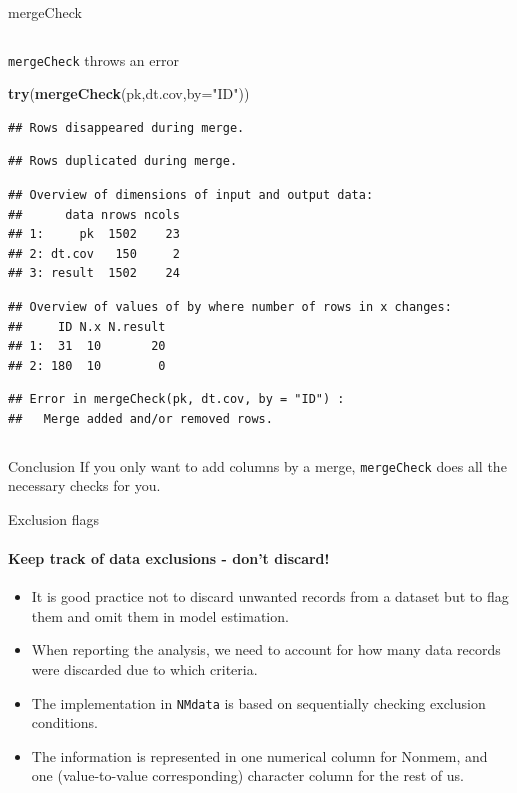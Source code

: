 \documentclass[
  8pt,
  ignorenonframetext,
  aspectratio=169]{beamer}
\newenvironment{Shaded}{\begin{snugshade}}{\end{snugshade}}
\newcommand{\DataTypeTok}[1]{\textcolor[rgb]{0.13,0.29,0.53}{#1}}
\newcommand{\KeywordTok}[1]{\textcolor[rgb]{0.13,0.29,0.53}{\textbf{#1}}}
\newcommand{\NormalTok}[1]{#1}
\newcommand{\StringTok}[1]{\textcolor[rgb]{0.31,0.60,0.02}{#1}}
\begin{document}
\begin{frame}[fragile]{mergeCheck}
\begin{columns}[T]
\begin{column}{0.48\textwidth}
\begin{block}{\texttt{mergeCheck} throws an error}
\begin{Shaded}
\begin{Highlighting}[]
\KeywordTok{try}\NormalTok{(}\KeywordTok{mergeCheck}\NormalTok{(pk,dt.cov,}\DataTypeTok{by=}\StringTok{"ID"}\NormalTok{))}
\end{Highlighting}
\end{Shaded}

\begin{verbatim}
## Rows disappeared during merge.
\end{verbatim}

\begin{verbatim}
## Rows duplicated during merge.
\end{verbatim}

\begin{verbatim}
## Overview of dimensions of input and output data:
##      data nrows ncols
## 1:     pk  1502    23
## 2: dt.cov   150     2
## 3: result  1502    24
\end{verbatim}

\begin{verbatim}
## Overview of values of by where number of rows in x changes:
##     ID N.x N.result
## 1:  31  10       20
## 2: 180  10        0
\end{verbatim}

\begin{verbatim}
## Error in mergeCheck(pk, dt.cov, by = "ID") : 
##   Merge added and/or removed rows.
\end{verbatim}
\end{block}
\end{column}

\normalsize
\end{columns}

\begin{block}{Conclusion}
\protect\hypertarget{conclusion}{}
If you only want to add columns by a merge, \texttt{mergeCheck} does all
the necessary checks for you.
\end{block}
\end{frame}

\begin{frame}[fragile]{Exclusion flags}
\protect\hypertarget{exclusion-flags}{}
\framesubtitle{Keep track of data exclusions - don't discard!}

\begin{itemize}
\item
  It is good practice not to discard unwanted records from a dataset but
  to flag them and omit them in model estimation.
\item
  When reporting the analysis, we need to account for how many data
  records were discarded due to which criteria.
\item
  The implementation in \texttt{NMdata} is based on sequentially
  checking exclusion conditions.
\item
  The information is represented in one numerical column for Nonmem, and
  one (value-to-value corresponding) character column for the rest of
  us.
\end{itemize}
\end{frame}
\end{document}
